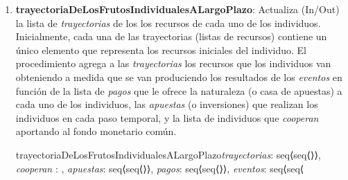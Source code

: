 \documentclass[10pt,a4paper]{article}
\begin{document}
\begin{enumerate}
    \item \textbf{trayectoriaDeLosFrutosIndividualesALargoPlazo}: Actualiza (In/Out) la lista de \textit{trayectorias} de los los recursos de cada uno de los individuos. Inicialmente, cada una de las trayectorias (listas de recursos) contiene un único elemento que representa los recursos iniciales del individuo. El procedimiento agrega a las \textit{trayectorias} los recursos que los individuos van obteniendo a medida que se van produciendo los resultados de los \textit{eventos} en función de la lista de \textit{pagos} que le ofrece la naturaleza (o casa de apuestas) a cada uno de los individuos, las \textit{apuestas} (o inversiones) que realizan los individuos en cada paso temporal, y la lista de individuos que \textit{cooperan} aportando al fondo monetario común.
    
    \begin{proc}{trayectoriaDeLosFrutosIndividualesALargoPlazo}{\Inout \textit{trayectorias}:
        seq⟨seq⟨\real⟩⟩, \In \textit{cooperan} : , \In \textit{apuestas}: seq⟨seq⟨\real⟩⟩, \In \textit{pagos}: seq⟨seq⟨\real⟩⟩, 
        \In \textit{eventos}: seq⟨seq⟨\nat}
    {}
\end{proc}
\end{enumerate}
\end{document}
